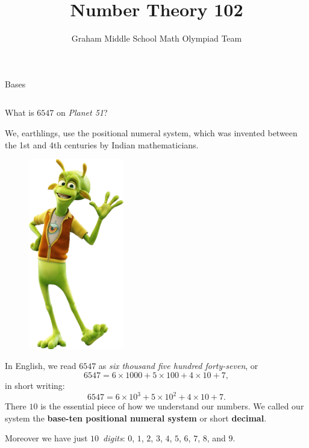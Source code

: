 \documentclass[9pt,aspectratio=169]{beamer}
\title{Number Theory 102}
\subtitle[Graham Middle School]{Graham Middle School Math Olympiad Team}
\begin{document}
\maketitle

\begin{frame}{Bases}
  \begin{columns}[T]
    \begin{column}{0.5\textwidth}
      \begin{problem}
        What is $6547$ on \emph{Planet 51}? 
      \end{problem}

      We, earthlings, use the positional numeral system, which was invented between the 1st and 4th centuries by Indian mathematicians. 
      \begin{figure}
        \vspace*{-1.5em}
        \hspace*{-1.5em}
        \includegraphics[width=0.37\textwidth]{05 - Number Theory 102/alien.png}
      \end{figure}
      In English, we read $6547$ as \emph{six thousand five hundred forty-seven}, or
      \[ 6547 = 6 \times 1000 + 5 \times 100 + 4 \times 10 + 7, \]
      in short writing:
      \[  6547 = 6 \times 10^3 + 5 \times 10^2 + 4 \times 10 + 7. \]
      There $10$ is the essential piece of how we understand our numbers. We called our system the \textbf{base-ten positional numeral system} or short \textbf{decimal}.
      
      Moreover we have just $10$~\emph{digits}: $0$, $1$, $2$, $3$, $4$, $5$, $6$, $7$, $8$, and $9$.


\end{column}
\end{columns}
\end{frame}
\end{document}

